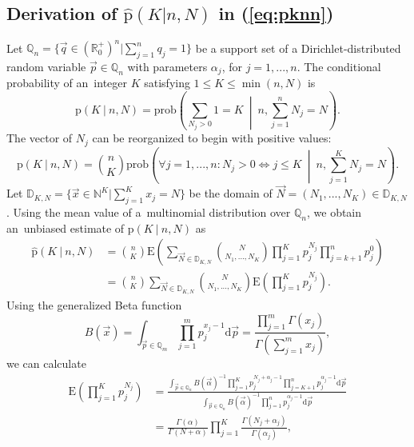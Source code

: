 \subsection {Derivation of $\hat{\mathrm{p}}(K|n,N)$ in (\ref{eq:pknn})}
\label{subsec:app1}
Let $\mathbb{Q}_{n} = \{ \vec{q} \in (\mathbb{R}_{0}^{+})^{n} | \sum_{j=1}^{n}q_{j} = 1 \}$ be a support set of a Dirichlet-distributed random variable $\vec{p} \in \mathbb{Q}_{n}$ with parameters $\alpha_j$, for $j = 1,...,n$. The conditional probability of an~integer $K$ satisfying $1 \le K \le \min(n,N)$ is 
\begin{equation} 
\label{eq:probpkn}
\text{p}(K \: | \: n,N) = \text{prob}\left(\sum_{N_{j}>0} 1 = K \: \middle| \: n, \sum_{j=1}^{n}N_{j} = N\right).
\end{equation}
The vector of $N_{j}$ can be reorganized to begin with positive values:
\begin{equation} 
\label{eq:probbinom}
\text{p}(K \: | \: n,N) = \binom{n}{K}\text{prob}\left( \forall j=1,...,n : N_{j} > 0 \Leftrightarrow j \le K \: \middle| \: n, \sum_{j=1}^{K}N_{j}=N\right).
\end{equation}
Let $\mathbb{D}_{K,N} = \{ \vec{x} \in \mathbb{N}^K | \sum_{j=1}^{K}x_{j} = N \}$ be the domain of $\vec{N} = (N_{1},...,N_{K}) \in \mathbb{D}_{K,N}$. Using the mean value of a~multinomial distribution over $\mathbb{Q}_{n}$, we obtain an~unbiased estimate of $\text{p}(K \: | \: n,N)$ as
\begin{equation} 
\label{eq:probbinomexp}
\begin{split}
\mathrm{\hat{p}}(K \: | \: n,N) & = \binom{n}{K} \text{E}\left(\sum_{\vec{N} \in \mathbb{D}_{K,N}} \binom{N}{N_{1},...,N_{K}} \prod_{j=1}^{K}p_{j}^{N_{j}} \prod_{j=k+1}^{n}p_{j}^{0} \right) \\
& = \binom{n}{K} \sum_{\vec{N} \in \mathbb{D}_{K,N}} \binom{N}{N_{1},...,N_{K}} \text{E}\left( \prod_{j=1}^{K}p_{j}^{N_{j}}\right).
\end{split}
\end{equation}
Using the generalized Beta function
\begin{equation} 
\label{eq:betafce}
B(\vec{x}) = \int_{\vec{p} \in \mathbb{Q}_{m}} \prod_{j=1}^{m} p_{j}^{x_{j}-1} \text{d}\vec{p} = \frac{\prod_{j=1}^{m} \Gamma(x_{j})}{\Gamma(\sum_{j=1}^{m}x_{j})},
\end{equation}
we can calculate
\begin{equation} 
\label{eq:expprod}
\begin{split}
\text{E}\left( \prod_{j=1}^{K}p_{j}^{N_{j}} \right) & = \frac{\int_{\vec{p} \in \mathbb{Q}_{n}} {B(\vec{\alpha})}^{-1} \prod_{j=1}^{K} p_{j}^{N_{j}+\alpha_{j}-1}  \prod_{j=K+1}^{n} p_{j}^{\alpha_{j}-1} \text{d}\vec{p}}{\int_{\vec{p} \in \mathbb{Q}_{n}}  {B(\vec{\alpha})}^{-1}\prod_{j=1}^{n} p_{j}^{\alpha_{j}-1} \text{d}\vec{p}} \\ 
& = \frac{\Gamma(\alpha)}{\Gamma(N+\alpha)} \prod_{j=1}^{K} \frac{\Gamma(N_{j}+\alpha_j)}{\Gamma(\alpha_j)},
\end{split}
\end{equation}
